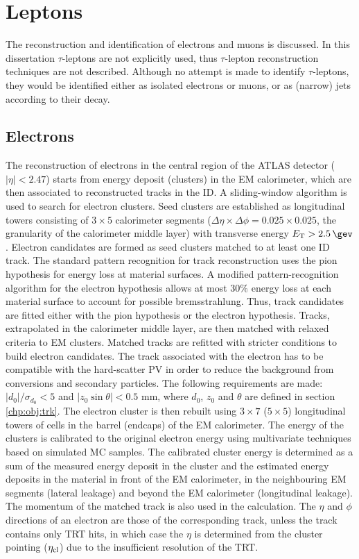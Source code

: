\section{Leptons}
\label{chp:obj:lep}

The reconstruction and identification of electrons and muons is discussed. In this dissertation $\tau$-leptons are not explicitly used, thus $\tau$-lepton reconstruction techniques are not described. Although no attempt is made to identify $\tau$-leptons, they would be identified either as isolated electrons or muons, or as (narrow) jets according to their decay.


\subsection{Electrons}
\label{chp:obj:sec:ele}
The reconstruction of electrons in the central region of the ATLAS detector ($|\eta| < 2.47$) starts from energy deposit (clusters) in the EM calorimeter, which are then associated to reconstructed tracks in the ID. A sliding-window algorithm \cite{ATLAS-CONF-2016-024} is used to search for electron clusters. Seed clusters are established as longitudinal towers consisting of $3\times5$ calorimeter segments ($\Delta \eta \times \Delta \phi = 0.025 \times 0.025$, the granularity of the calorimeter middle layer)  with transverse energy $E_{\rm T}> 2.5 \, \gev$. Electron candidates are formed as seed clusters matched to at least one ID track. The standard pattern recognition for track reconstruction uses the pion hypothesis for energy loss at material surfaces. A modified pattern-recognition algorithm for the electron hypothesis allows at most $30\%$ energy loss at each material surface to account for possible bremsstrahlung. Thus, track candidates are fitted either with the pion hypothesis or the electron hypothesis. Tracks, extrapolated in the calorimeter middle layer, are then matched with relaxed criteria to EM clusters. Matched tracks are refitted with stricter conditions to build electron candidates. The track associated with the electron has to be compatible with the hard-scatter PV in order to reduce the background from conversions and secondary particles. The following requirements are made: $|d_{0}|/\sigma_{d_{0}}< 5$ and $|z_{0} \sin \theta| < 0.5$ mm, where $d_{0}$, $z_{0}$ and $\theta$ are defined in section \ref{chp:obj:trk}. The electron cluster is then rebuilt using $3\times7$ ($5\times5$) longitudinal towers of cells in the barrel (endcaps) of the EM calorimeter. The energy of the clusters is calibrated to the original electron energy using multivariate techniques \cite{ATL-PHYS-PUB-2016-015} based on simulated MC samples.
The calibrated cluster energy is determined as a sum of the measured energy deposit in the cluster and the estimated energy deposits in the material in front of the EM calorimeter, in the neighbouring EM segments (lateral leakage) and beyond the EM calorimeter (longitudinal leakage). The momentum of the matched track is also used in the calculation. The $\eta$ and $\phi$ directions of an electron are those of the corresponding track, unless the track contains only TRT hits, in which case the $\eta$ is determined from the cluster pointing ($\eta_{\rm cl}$) due to the insufficient resolution of the TRT.

